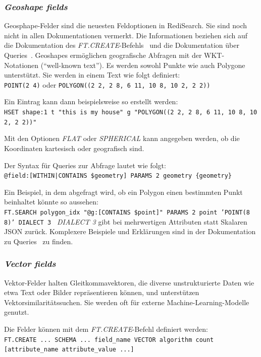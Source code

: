 \subsubsection{\emph{Geoshape fields}}
Geosphape-Felder sind die neuesten Feldoptionen in RediSearch. Sie sind noch nicht in allen Dokumentationen vermerkt. Die Informationen beziehen sich auf die Dokumentation des \emph{FT.CREATE}-Befehls~\cite{redis_ltd_ftcreate_nodate} und die Dokumentation über Queries~\cite{redis_ltd_query_nodate}. 
Geoshapes ermöglichen geografische Abfragen mit der WKT-Notationen (\enquote{well-known text}).
Es werden sowohl Punkte wie auch Polygone unterstützt. Sie werden in einem Text wie folgt definiert:\\
\texttt{POINT(2 4)} oder \texttt{POLYGON((2 2, 2 8, 6 11, 10 8, 10 2, 2 2))}

Ein Eintrag kann dann beispielsweise so erstellt werden:\\
\texttt{HSET shape:1 t "this is my house" g "POLYGON((2 2, 2 8, 6 11, 10 8, 10 2, 2 2))"}


Mit den Optionen \emph{FLAT} oder \emph{SPHERICAL} kann angegeben werden, ob die Koordinaten kartesisch  oder  geografisch sind.

Der Syntax für Queries zur Abfrage lautet wie folgt:\\
\texttt{@field:[{WITHIN|CONTAINS} \$geometry] PARAMS 2 geometry \{geometry\}}

Ein Beispiel, in dem abgefragt wird, ob ein Polygon einen bestimmten Punkt beinhaltet könnte so aussehen:\\
\texttt{FT.SEARCH polygon\_idx "@g:[CONTAINS \$point]" PARAMS 2 point 'POINT(8 8)' DIALECT 3
}
\emph{DIALECT 3} gibt bei mehrwertigen Attributen statt Skalaren JSON zurück.
Komplexere Beispiele und Erklärungen sind in der Dokumentation zu Queries~\cite{redis_ltd_query_nodate} zu finden.


\subsubsection{\emph{Vector fields}} Vektor-Felder halten Gleitkommavektoren, die diverse unstrukturierte Daten wie etwa Text oder Bilder repräsentieren können, und unterstützen Vektorsimilaritätssuchen. Sie werden oft für externe Machine-Learning-Modelle genutzt.

Die Felder können mit dem \emph{FT.CREATE}-Befehl definiert werden:\\
\texttt{FT.CREATE ... SCHEMA ... {field\_name} VECTOR {algorithm} {count} [{attribute\_name} {attribute\_value} ...]
}

